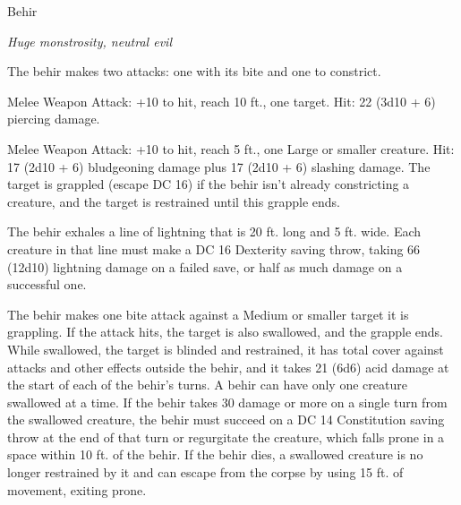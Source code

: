 \begin{monsterbox}{Behir}
\begin{hangingpar}
\textit{Huge monstrosity, neutral evil}
\end{hangingpar}
\dndline%
\basics[%
armorclass = 17,
hitpoints = 16d12 + 64,
speed = {50 ft., climb 40 ft.}
]
\dndline%
\stats[%
STR = \stat{23},
DEX = \stat{16},
CON = \stat{18},
INT = \stat{7},
WIS = \stat{14},
CHA = \stat{12}
]
\dndline%
\details[%
skills={Stealth +7, Perception +6, },
damageimmunities={lightning},
savingthrows={},
conditionimmunities={},
damageresistances={},
damagevulnerabilities={},
senses={darkvision 90 ft., passive Perception 16},
languages={Draconic},
challenge=11
]
\dndline%
\begin{monsteraction}[Multiattack]
The behir makes two attacks: one with its bite and one to constrict.
\end{monsteraction}
\begin{monsteraction}[Bite]
Melee Weapon Attack: +10 to hit, reach 10 ft., one target. Hit: 22 (3d10 + 6) piercing damage.
\end{monsteraction}
\begin{monsteraction}[Constrict]
Melee Weapon Attack: +10 to hit, reach 5 ft., one Large or smaller creature. Hit: 17 (2d10 + 6) bludgeoning damage plus 17 (2d10 + 6) slashing damage. The target is grappled (escape DC 16) if the behir isn't already constricting a creature, and the target is restrained until this grapple ends.
\end{monsteraction}
\begin{monsteraction}
The behir exhales a line of lightning that is 20 ft. long and 5 ft. wide. Each creature in that line must make a DC 16 Dexterity saving throw, taking 66 (12d10) lightning damage on a failed save, or half as much damage on a successful one.
\end{monsteraction}
\begin{monsteraction}[Swallow]
The behir makes one bite attack against a Medium or smaller target it is grappling. If the attack hits, the target is also swallowed, and the grapple ends. While swallowed, the target is blinded and restrained, it has total cover against attacks and other effects outside the behir, and it takes 21 (6d6) acid damage at the start of each of the behir's turns. A behir can have only one creature swallowed at a time.
If the behir takes 30 damage or more on a single turn from the swallowed creature, the behir must succeed on a DC 14 Constitution saving throw at the end of that turn or regurgitate the creature, which falls prone in a space within 10 ft. of the behir. If the behir dies, a swallowed creature is no longer restrained by it and can escape from the corpse by using 15 ft. of movement, exiting prone.
\end{monsteraction}
\end{monsterbox}